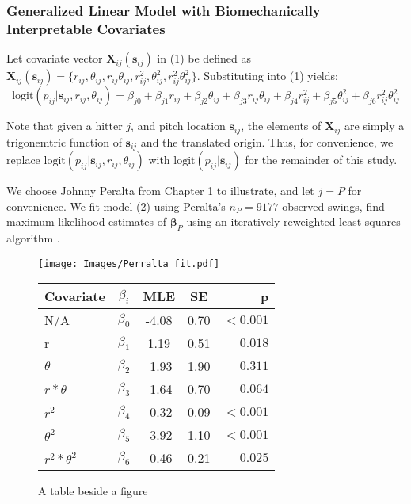 \subsubsection{Generalized Linear Model with Biomechanically Interpretable Covariates} %

Let covariate vector $\pmb{X}_{ij}(\pmb{s}_{ij})$ in (1) be defined as $\pmb{X}_{ij}(\pmb{s}_{ij}) = \{r_{ij}, \theta_{ij}, r_{ij}\theta_{ij}, r_{ij}^{2}, \theta_{ij}^{2}, r_{ij}^{2}\theta_{ij}^{2}\}$. Substituting into (1) yields:
\begin{equation}
\text{logit}(p_{ij}|\pmb{s}_{ij}, r_{ij}, \theta_{ij}) = \beta_{j0} + \beta_{j1}r_{ij} + \beta_{j2} \theta_{ij} + \beta_{j3} r_{ij} \theta_{ij} + \beta_{j4}r_{ij}^{2} + \beta_{j5} \theta_{ij}^{2} + \beta_{j6} r_{ij}^{2} \theta_{ij}^{2}
\end{equation}

Note that given a hitter $j$, and pitch location $\pmb{s}_{ij}$, the elements of $\pmb{X}_{ij}$ are simply a trigonemtric function of $\pmb{s}_{ij}$ and the translated origin. Thus, for convenience, we replace $\text{logit}(p_{ij}|\pmb{s}_{ij}, r_{ij}, \theta_{ij})$ with $\text{logit}(p_{ij}|\pmb{s}_{ij})$ for the remainder of this study.

We choose Johnny Peralta from Chapter 1 to illustrate, and let $j = P$ for convenience. We fit model (2) using Peralta's $n_{P} = 9177$ observed swings, find maximum likelihood estimates of $\pmb{\beta}_{P}$ using an iteratively reweighted least squares algorithm \citep{Myers2012}.

  \begin{figure}[!ht]
    \centering
    \texttt{[image: Images/Perralta\_fit.pdf]}
    \qquad
\begin{tabular}[b]{ l | c | c | c | r }
    \hline
    Covariate         & $\beta_{i}$ & MLE   & SE     &      p \\ \hline \hline
    N/A               & $\beta_{0}$ & -4.08 & 0.70 & $ <0.001$ \\ \hline
    r                 & $\beta_{1}$ &  1.19 & 0.51 & $  0.018$ \\ \hline
    $\theta$          & $\beta_{2}$ & -1.93 & 1.90 & $  0.311$ \\ \hline
    $r*\theta$        & $\beta_{3}$ & -1.64 & 0.70 & $  0.064$ \\ \hline
    $r^{2}$           & $\beta_{4}$ & -0.32 & 0.09 & $ <0.001$ \\ \hline
    $\theta^{2}$      & $\beta_{5}$ & -3.92 & 1.10 & $ <0.001$ \\ \hline
    $r^{2}*\theta^{2}$& $\beta_{6}$ & -0.46 & 0.21 & $  0.025$ \\ \hline
    \hline
\end{tabular}
    \captionsetup{labelformat=andtable}
    \caption{A table beside a figure}
  \end{figure}




